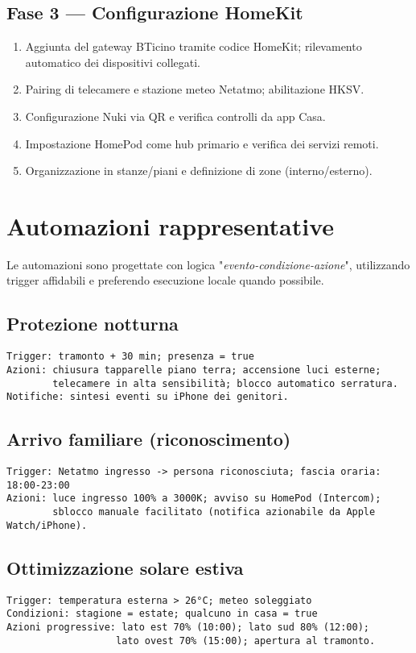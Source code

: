 \subsection{Fase 3 — Configurazione HomeKit}
\begin{enumerate}
  \item Aggiunta del gateway BTicino tramite codice HomeKit; rilevamento automatico dei dispositivi collegati.
  \item Pairing di telecamere e stazione meteo Netatmo; abilitazione HKSV.
  \item Configurazione Nuki via QR e verifica controlli da app Casa.
  \item Impostazione HomePod come hub primario e verifica dei servizi remoti.
  \item Organizzazione in stanze/piani e definizione di zone (interno/esterno).
\end{enumerate}

\section{Automazioni rappresentative}
Le automazioni sono progettate con logica "\textit{evento-condizione-azione}", utilizzando trigger affidabili e preferendo esecuzione locale quando possibile.

\subsection*{Protezione notturna}
\begin{verbatim}
Trigger: tramonto + 30 min; presenza = true
Azioni: chiusura tapparelle piano terra; accensione luci esterne;
        telecamere in alta sensibilità; blocco automatico serratura.
Notifiche: sintesi eventi su iPhone dei genitori.
\end{verbatim}

\subsection*{Arrivo familiare (riconoscimento)}
\begin{verbatim}
Trigger: Netatmo ingresso -> persona riconosciuta; fascia oraria: 18:00-23:00
Azioni: luce ingresso 100% a 3000K; avviso su HomePod (Intercom);
        sblocco manuale facilitato (notifica azionabile da Apple Watch/iPhone).
\end{verbatim}

\subsection*{Ottimizzazione solare estiva}
\begin{verbatim}
Trigger: temperatura esterna > 26°C; meteo soleggiato
Condizioni: stagione = estate; qualcuno in casa = true
Azioni progressive: lato est 70% (10:00); lato sud 80% (12:00);
                   lato ovest 70% (15:00); apertura al tramonto.
\end{verbatim}

